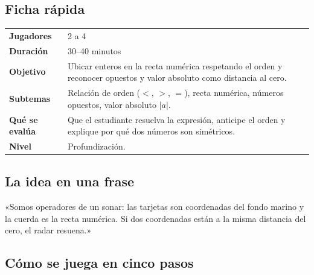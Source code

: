 \documentclass[12pt, letterpaper]{article}
\newcommand{\abs}[1]{\lvert #1\rvert}
\begin{document}
\subsection{Ficha rápida}

\begin{center}
\small
\begin{tabular}{@{}p{3cm} p{12.2cm}@{}}
\toprule
\textbf{Jugadores} & 2 a 4\\
\textbf{Duración} & 30--40 minutos\\
\textbf{Objetivo} & Ubicar enteros en la recta numérica respetando el orden y reconocer opuestos y valor absoluto como distancia al cero.\\
\textbf{Subtemas} & Relación de orden ($<$, $>$, $=$), recta numérica, números opuestos, valor absoluto $\abs{a}$.\\
\textbf{Qué se evalúa} & Que el estudiante resuelva la expresión, anticipe el orden y explique por qué dos números son simétricos.\\
\textbf{Nivel} & Profundización.\\
\bottomrule
\end{tabular}
\end{center}

\subsection{La idea en una frase}

\begin{cuadroextra}
  «Somos operadores de un sonar: las tarjetas son coordenadas del fondo marino y la cuerda es la recta numérica. Si dos coordenadas están a la misma distancia del cero, el radar resuena.»
\end{cuadroextra}

\begin{center}
\end{center}

\subsection{Cómo se juega en cinco pasos}
\end{document}

